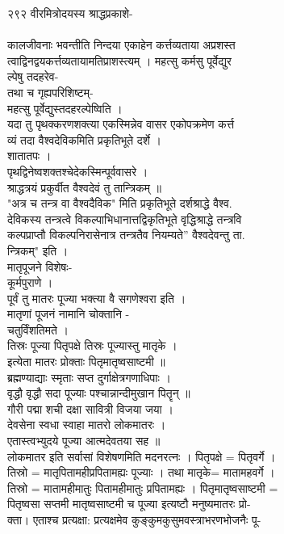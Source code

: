 \documentclass[11pt, openany]{book}
\begin{document}
{२९२ वीरमित्रोदयस्य श्राद्धप्रकाशे-}{\\
~\\
}{कालजीवनाः भवन्तीति निन्दया एकाहेन कर्त्तव्यताया अप्रशस्त\\
त्वाद्विनद्वयकर्त्तव्यतायामतिप्राशस्त्यम् । महत्सु कर्मसु पूर्वेद्युर\\
ल्पेषु तदहरेव-\\
तथा च गृह्यपरिशिष्टम्-\\
महत्सु पूर्वेद्युस्तदहरल्पेष्विति ।\\
यदा तु पृथक्करणशक्त्या एकस्मिन्नेव वासर एकोपक्रमेण कर्त्त\\
व्यं तदा वैश्वदेविकमिति प्रकृतिभूते दर्शे ।\\
शातातपः ।\\
पृथद्विनेष्वशक्तश्चेदेकस्मिन्पूर्ववासरे ।\\
श्राद्धत्रयं प्रकुर्वीत वैश्वदेवं तु तान्त्रिकम् ॥\\
"अत्र च तन्त्र वा वैश्वदैविक" मिति प्रकृतिभूते दर्शश्राद्धे वैश्व.\\
देविकस्य तन्त्रत्वे विकल्पाभिधानात्तद्विकृतिभूते वृद्धिश्राद्धे
तन्त्रवि\\
कल्पप्राप्तौ विकल्पनिरासेनात्र तन्त्रतैव नियम्यते'' वैश्वदेवन्तु ता.\\
न्त्रिकम्" इति ।\\
मातृपूजने विशेषः-\\
कूर्मपुराणे ।\\
पूर्वं तु मातरः पूज्या भक्त्या वै सगणेश्वरा इति ।\\
मातृणां पूजनं नामानि चोक्तानि -\\
चतुर्विंशतिमते ।\\
तिस्रः पूज्या पितृपक्षे तिस्रः पूज्यास्तु मातृके ।\\
इत्येता मातरः प्रोक्ताः पितृमातृष्वसाष्टमी ॥\\
ब्रह्मण्याद्याः स्मृताः सप्त दुर्गाक्षेत्रगणाधिपाः ।\\
वृद्धौ वृद्धौ सदा पूज्याः पश्चान्नान्दीमुखान पितॄन् ॥\\
गौरी पद्मा शची दक्षा सावित्री विजया जया ।\\
देवसेना स्वधा स्वाहा मातरो लोकमातरः ।\\
एतास्त्वभ्युदये पूज्या आत्मदेवतया सह ॥\\
लोकमातर इति सर्वासां विशेषणमिति मदनरत्नः । पितृपक्षे = पितृवर्गे ।\\
तिस्रो = मातृपितामहीप्रपितामह्यः पूज्याः । तथा मातृके= मातामहवर्गे ।\\
तिस्रो = मातामहीमातुः पितामहीमातुः प्रपितामह्यः । पितृमातृष्वसाष्टमी =\\
पितृष्वसा सप्तमी मातृष्वसाष्टमी च पूज्या इत्यष्टौ मनुष्यमातरः प्रो-\\
क्ता। एताश्च प्रत्यक्षा: प्रत्यक्षमेव कुङ्कुमकुसुमवस्त्राभरणभोजनैः पू-\\


}
\end{document}
